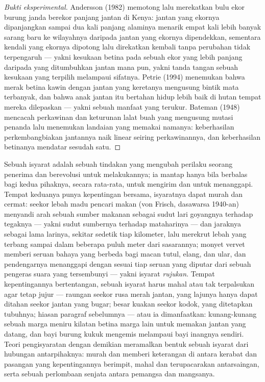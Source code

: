 \begin{proof}[Bukti eksperimental]
Andersson (1982) memotong lalu merekatkan bulu ekor burung janda
berekor panjang jantan di Kenya: jantan yang ekornya dipanjangkan sampai dua kali panjang
alaminya menarik empat kali lebih banyak sarang baru ke wilayahnya daripada
jantan yang ekornya dipendekkan, sementara kendali yang ekornya dipotong lalu
direkatkan kembali tanpa perubahan tidak terpengaruh --- yakni kesukaan betina pada sebuah ekor yang
lebih panjang daripada yang ditumbuhkan jantan mana pun, yakni tanda tangan sebuah kesukaan yang terpilih melampaui
sifatnya. Petrie (1994) menemukan bahwa merak betina kawin dengan jantan yang
keretanya mengusung bintik mata terbanyak, dan bahwa anak jantan itu bertahan hidup
lebih baik di hutan tempat mereka dilepaskan --- yakni sebuah manfaat  yang
terukur. Bateman (1948) mencacah perkawinan dan keturunan lalat buah
yang mengusung mutasi penanda lalu menemukan landaian yang memakai namanya:
keberhasilan perkembangbiakan jantannya naik linear seiring perkawinannya, dan
keberhasilan betinanya mendatar sesudah satu.
\end{proof}

\begin{proposition}\label{prop:b3:behavioural-ecology:signals}
Sebuah isyarat adalah sebuah tindakan yang mengubah perilaku seorang penerima dan berevolusi untuk
melakukannya; ia mantap hanya bila berbalas bagi kedua pihaknya, secara rata-rata, untuk mengirim
dan untuk menanggapi. Tempat keduanya punya kepentingan bersama, isyaratnya dapat
murah dan cermat: \emph{} seekor lebah madu pencari makan (von
Frisch, dasawarsa 1940-an) menyandi arah sebuah sumber makanan sebagai sudut
lari goyangnya terhadap tegaknya --- yakni sudut sumbernya terhadap mataharinya
--- dan jaraknya sebagai lama larinya, sekitar sedetik tiap
kilometer, lalu merekrut lebah yang terbang sampai dalam beberapa puluh meter dari
sasarannya; monyet vervet memberi seruan bahaya yang berbeda bagi macan tutul, elang,
dan ular, dan pendengarnya menanggapi dengan sesuai tiap seruan yang diputar
dari sebuah pengeras suara yang tersembunyi --- yakni isyarat \emph{rujukan}. Tempat kepentingannya
bertentangan, sebuah isyarat harus mahal atau tak terpalsukan agar tetap jujur ---
raungan seekor rusa merah jantan, yang lajunya hanya dapat ditahan seekor jantan yang bugar;
besar kuakan seekor kodok, yang ditetapkan tubuhnya; hiasan paragraf
sebelumnya --- atau ia dimanfaatkan: kunang-kunang sebuah marga meniru
kilatan betina marga lain untuk memakan jantan yang datang, dan bayi
burung kukuk mengemis melampaui bayi inangnya sendiri. Teori pengisyaratan dengan demikian meramalkan
bentuk sebuah isyarat dari hubungan antarpihaknya: murah dan
memberi keterangan di antara kerabat dan pasangan yang kepentingannya berimpit, mahal dan
terupacarakan antarsaingan, serta sebuah perlombaan senjata antara pemangsa dan mangsanya.
\end{proposition}
\admitted

